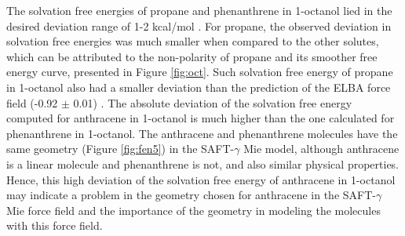 \documentclass[final,12p,times,twocolumn]{elsarticle}
\begin{document}
    The solvation free energies of propane and phenanthrene in 1-octanol lied in the desired deviation range of 1-2 kcal/mol \cite{doimobley}. For propane, the observed deviation in solvation free energies was much smaller when compared to the other solutes, which can be attributed to the non-polarity of propane and its smoother free energy curve, presented in Figure \ref{fig:oct}. Such solvation free energy of propane in 1-octanol also had a smaller deviation than the prediction of the ELBA force field (-0.92 $\pm$ 0.01) \cite{doi:10.1021/acs.jctc.5b00963}. The absolute deviation of the solvation free energy computed for anthracene in 1-octanol is much higher than the one calculated for phenanthrene in 1-octanol. The anthracene and phenanthrene molecules have the same geometry (Figure \ref{fig:fen5}) in the SAFT-$\gamma$ Mie model, although anthracene is a linear molecule and phenanthrene is not, and also similar physical properties. Hence, this high deviation of the solvation free energy of anthracene in 1-octanol may indicate a problem in the geometry chosen for anthracene in the SAFT-$\gamma$ Mie force field and the importance of the geometry in modeling the molecules with this force field.   
	
\end{document}
